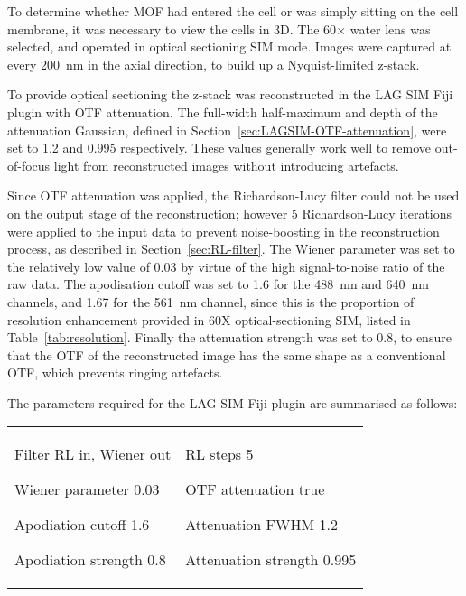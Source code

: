 To determine whether MOF had entered the cell or was simply sitting on the cell membrane, it was necessary to view the cells in 3D. 
The 60$\times$ water lens was selected, and operated in optical sectioning SIM mode.  
Images were captured at every \SI{200}{\nano\metre} in the axial direction, to build up a Nyquist-limited z-stack. 

To provide optical sectioning the z-stack was reconstructed in the LAG SIM Fiji plugin with OTF attenuation. 
The full-width half-maximum and depth of the attenuation Gaussian, defined in Section~\ref{sec:LAGSIM-OTF-attenuation}, were set to 1.2 and 0.995 respectively.
These values generally work well to remove out-of-focus light from reconstructed images without introducing artefacts. 

Since OTF attenuation was applied, the Richardson-Lucy filter could not be used on the output stage of the reconstruction; however 5 Richardson-Lucy iterations were applied to the input data to prevent noise-boosting in the reconstruction process, as described in Section~\ref{sec:RL-filter}. 
The Wiener parameter was set to the relatively low value of 0.03 by virtue of the high signal-to-noise ratio of the raw data. 
The apodisation cutoff was set to 1.6 for the \SI{488}{\nano\metre} and \SI{640}{\nano\metre} channels, and 1.67 for the \SI{561}{\nano\metre} channel, since this is the proportion of resolution enhancement provided in 60X optical-sectioning SIM, listed in Table~\ref{tab:resolution}. 
Finally the attenuation strength was set to 0.8, to ensure that the OTF of the reconstructed image has the same shape as a conventional OTF, which prevents ringing artefacts. 

The parameters required for the LAG SIM Fiji plugin are summarised as follows:
\newline
\begin{tabular}{p{}p{}}
\begin{labelling}[margin={Attenuation strength}]
	\item[Filter] RL in, Wiener out
	\item[Wiener parameter] 0.03
	\item[Apodiation cutoff] 1.6
	\item[Apodiation strength] 0.8
\end{labelling} &
\begin{labelling}[margin={Attenuation strength}]
	\item[RL steps] 5
	\item[OTF attenuation] true
	\item[Attenuation FWHM] 1.2
	\item[Attenuation strength] 0.995 
\end{labelling}
\end{tabular} 

